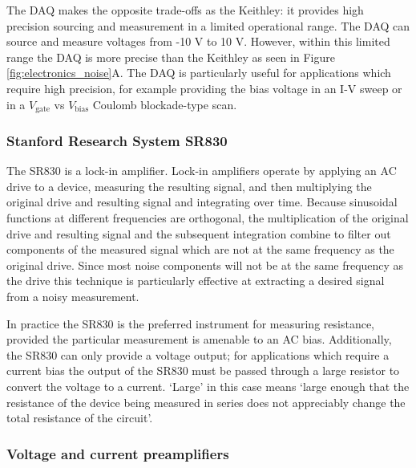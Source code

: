 \documentclass[edeposit,fullpage,draftthesis]{uiucthesis2009}
\begin{document}
            The DAQ makes the opposite trade-offs as the Keithley: 
            it provides high precision sourcing and measurement in a limited operational range.
            The DAQ can source and measure voltages from -10 V to 10 V.
            However, within this limited range the DAQ is more precise than the Keithley as seen
            in Figure \ref{fig:electronics_noise}A.
            The DAQ is particularly useful for applications which require high precision, for example
            providing the bias voltage in an I-V sweep or in a $V_\text{gate}$ vs $V_\text{bias}$ Coulomb
            blockade-type scan.
            
            \subsubsection*{Stanford Research System SR830} 
            
            The SR830 is a lock-in amplifier. Lock-in amplifiers operate by applying an AC drive to
            a device, measuring the resulting signal, and then multiplying the original drive
            and resulting signal and integrating over time.
            Because sinusoidal functions at different frequencies are orthogonal, the multiplication
            of the original drive and resulting signal and the subsequent integration combine to filter out
            components of the measured signal which are not at the same frequency as the original drive.
            Since most noise components will not be at the same frequency as the drive this technique
            is particularly effective at extracting a desired signal from a noisy measurement.
            
            In practice the SR830 is the preferred instrument for measuring resistance,
            provided the particular measurement is amenable to an AC bias.
            Additionally, the SR830 can only provide a voltage output; for applications which require a current bias 
            the output of the SR830 must be passed through a large resistor to convert the 
            voltage to a current. `Large' in this case means `large enough that the resistance of the device 
            being measured in
            series does not appreciably change the total resistance of the circuit'.
            
            \subsubsection*{Voltage and current preamplifiers}
            
\end{document}
